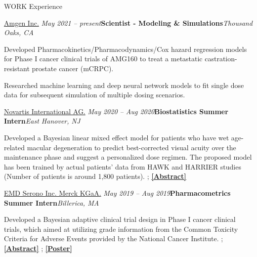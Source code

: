 \documentclass{resume} %
\begin{document}

\begin{rSection}{WORK Experience}

\begin{rSubsection}{
\href{https://www.amgen.com/}{Amgen Inc.}
}{\em May 2021 -- present}{\textbf{Scientist - Modeling \& Simulations}}{\em Thousand Oaks, CA}
\item 
Developed Pharmacokinetics/Pharmacodynamics/Cox hazard regression models for Phase I cancer clinical trials of AMG160 to treat a metastatic castration-resistant prostate cancer (mCRPC).
\item 
Researched machine learning and deep neural network models to fit single dose data for subsequent simulation of multiple dosing scenarios. 
\end{rSubsection}

\begin{rSubsection}{
\href{https://www.pharma.us.novartis.com/}{Novartis International AG.}
}{\em May 2020 -- Aug 2020}{\textbf{Biostatistics Summer Intern}}{\em East Hanover, NJ}
\item 
Developed a Bayesian linear mixed effect model for patients who have wet age-related macular degeneration to predict best-corrected visual acuity over the maintenance phase and suggest a personalized dose regimen. The proposed model has been trained by actual patients' data from HAWK and HARRIER studies (Number of patients is around 1,800 patients). ; \href{https://sites.google.com/view/seyoonlee/home/projects/novartis-summer-internship-project?authuser=0#h.dfc3zhswkx8m}
{\underline{\textbf{[Abstract]}}}
\end{rSubsection}


\newpage
\begin{rSubsection}{
\href{https://www.emdserono.com/us-en}{EMD Serono Inc. Merck KGaA.}
}{\em May 2019 -- Aug 2019}{\textbf{Pharmacometrics Summer Intern}}{\em Billerica, MA}
\item 
Developed a Bayesian adaptive clinical trial design in Phase I cancer clinical trials, which aimed at utilizing grade information from the Common Toxicity Criteria for Adverse Events provided by the National Cancer Institute. ; 
\href{https://sites.google.com/view/seyoonlee/home/projects/merck-group-summer-internship-project?authuser=0#h.lnkjghpa5ikt}
{\underline{\textbf{[Abstract]}}}
;
\href{https://www.dropbox.com/s/dnlynbzl6ojmgwh/ACOP_Se_Yoon_Lee_PhD.pdf?dl=0}
{\underline{\textbf{[Poster]}}}
\end{rSubsection}



\end{rSection}
\end{document}
